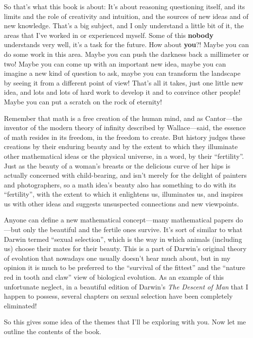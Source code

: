 \documentclass[12pt]{book}
\begin{document}
So that's what this book is about: 
It's about reasoning questioning itself, and its limits and the role of
creativity and intuition, and the sources of new ideas and of new knowledge.
That's a big subject, and I only understand a little bit of it, the areas that I've worked in
or experienced myself.
Some of this \textbf{nobody} understands very well, it's a task for the future. 
How about \textbf{you}?!  Maybe you can do some work in this area. 
Maybe you can push the darkness back a millimeter or two!
Maybe you can come up with an important new idea, maybe you can imagine a new kind of question
to ask, maybe you can transform the landscape by seeing it from a different point of view!
That's all it takes, just one little new idea, and lots and lots of hard work to develop it and to
convince other people!
Maybe you can put a scratch on the rock of eternity!

Remember that math is a free creation of the human mind, and as Cantor---the inventor
of the modern theory of infinity described by Wallace---said,
the essence of math resides in its freedom, in the freedom to create.
But history judges these creations by their enduring beauty and by the extent
to which they illuminate other mathematical ideas or the physical universe, in
a word, by their ``fertility''.
Just as the beauty of a woman's breasts or the delicious curve of her hips 
is actually concerned with child-bearing, and isn't merely for the delight of painters
and photographers, so a math idea's beauty also has something to do with its ``fertility'',
with the extent to which it enlightens us, illuminates us, and inspires us with other ideas and
suggests unsuspected connections and new viewpoints.

Anyone can define a new mathematical concept---many mathematical papers do---but only the beautiful
and the fertile ones survive. It's sort of similar to what Darwin termed ``sexual selection'',
which is the way in which animals (including us) choose their mates for their beauty. 
This is a part of Darwin's original theory of evolution
that nowadays one usually doesn't hear much about, but in my opinion it is 
much to be preferred to the ``survival of the
fittest'' and the ``nature red in tooth and claw'' view of biological evolution. As an example of this
unfortunate neglect, in a beautiful edition
of Darwin's \emph{The Descent of Man} that I happen to possess, several chapters on sexual selection 
have been completely eliminated!

So this gives some idea of the themes that I'll be exploring with you.
Now let me outline the contents of the book.
\end{document}
